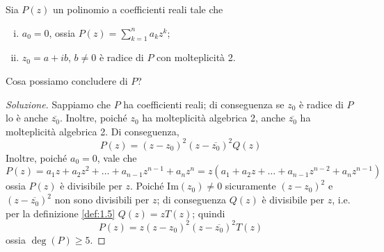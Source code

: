 \begin{exercise}
    \label{ex:3.8}
    Sia $P(z)$ un polinomio a coefficienti reali tale che 
    \begin{enumerate}[(i)]
        \item $a_0=0$, ossia $P(z) = \sum_{k=1}^n a_k z^k$;
        \item $z_0 = a+ib$, $b\ne 0$ è radice di $P$ con molteplicità 2.
    \end{enumerate}
    Cosa possiamo concludere di $P$?
\end{exercise}
\begin{proof}[Soluzione]
    Sappiamo che $P$ ha coefficienti reali; di conseguenza se $z_0$ è radice di $P$ lo è anche $\overline{z_0}$. Inoltre, poiché $z_0$ ha molteplicità algebrica 2, anche $\overline{z_0}$ ha molteplicità algebrica 2. Di conseguenza,
    \[
    P(z) = (z-z_0)^2(z-\overline{z_0})^2 Q(z)
    \]
    Inoltre, poiché $a_0=0$, vale che
    \[
    P(z) = a_1 z + a_2 z^2 + \dots + a_{n-1}z^{n-1}+a_n z^n = z(a_1 + a_2 z + \dots + a_{n-1}z^{n-2} + a_n z^{n-1})
    \]
    ossia $P(z)$ è divisibile per $z$. Poiché $\mathrm{Im}(z_0)\ne 0$ sicuramente $(z-z_0)^2$ e $(z-\overline{z_0})^2$ non sono divisibili per $z$; di conseguenza $Q(z)$ è divisibile per $z$, i.e. per la definizione \ref{def:1.5} $Q(z) = zT(z)$;
    quindi
    \[
    P(z) = z(z-z_0)^2(z-\overline{z_0})^2 T(z)
    \]
    ossia $\deg(P)\ge 5$.
\end{proof}
\newpage
